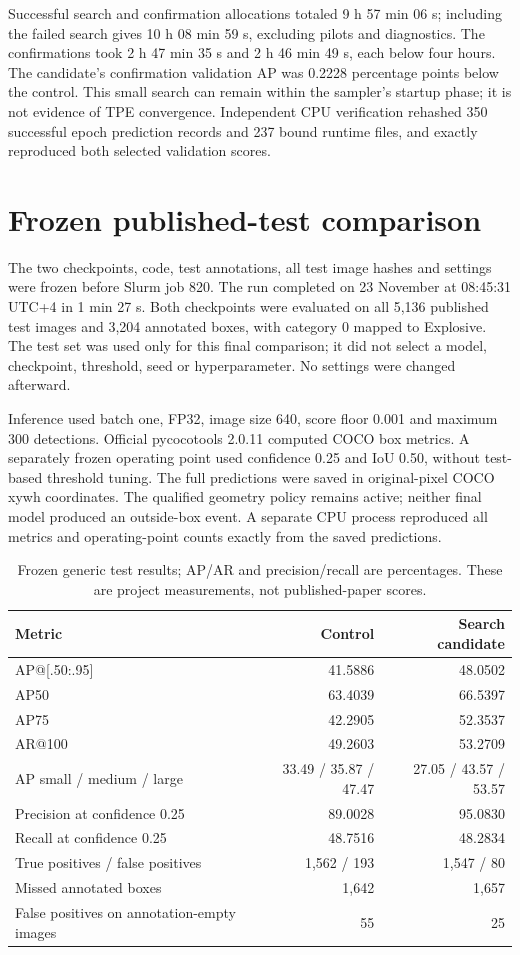 Successful search and confirmation allocations totaled 9 h 57 min 06 s;
including the failed search gives 10 h 08 min 59 s, excluding pilots and
diagnostics. The confirmations took 2 h 47 min 35 s and 2 h 46 min 49 s, each
below four hours. The candidate's confirmation validation AP was 0.2228
percentage points below the control. This small search can remain within the
sampler's startup phase; it is not evidence of TPE convergence. Independent CPU
verification rehashed 350 successful epoch prediction records and 237 bound
runtime files, and exactly reproduced both selected validation scores.

\section{Frozen published-test comparison}
The two checkpoints, code, test annotations, all test image hashes and settings
were frozen before Slurm job 820. The run completed on 23 November at 08:45:31
UTC+4 in 1 min 27 s. Both checkpoints were evaluated on all 5,136 published
test images and 3,204 annotated boxes, with category 0 mapped to Explosive.
The test set was used only for this final comparison; it did not select a model,
checkpoint, threshold, seed or hyperparameter. No settings were changed afterward.

Inference used batch one, FP32, image size 640, score floor 0.001 and maximum
300 detections. Official pycocotools 2.0.11 computed COCO box metrics. A separately
frozen operating point used confidence 0.25 and IoU 0.50, without test-based
threshold tuning. The full predictions were saved in original-pixel COCO xywh
coordinates. The qualified geometry policy remains active; neither final model
produced an outside-box event. A separate CPU process reproduced all metrics
and operating-point counts exactly from the saved predictions.

\begin{table}[htbp]\centering\small
\caption{Frozen generic test results; AP/AR and precision/recall are percentages.
These are project measurements, not published-paper scores.}
\label{tab:t41-test}
\begin{tabular}{lrr}
\toprule Metric & Control & Search candidate\\\midrule
AP@[.50:.95] & 41.5886 & 48.0502\\
AP50 & 63.4039 & 66.5397\\
AP75 & 42.2905 & 52.3537\\
AR@100 & 49.2603 & 53.2709\\
AP small / medium / large & 33.49 / 35.87 / 47.47 & 27.05 / 43.57 / 53.57\\
Precision at confidence 0.25 & 89.0028 & 95.0830\\
Recall at confidence 0.25 & 48.7516 & 48.2834\\
True positives / false positives & 1,562 / 193 & 1,547 / 80\\
Missed annotated boxes & 1,642 & 1,657\\
False positives on annotation-empty images & 55 & 25\\
\bottomrule
\end{tabular}
\end{table}

